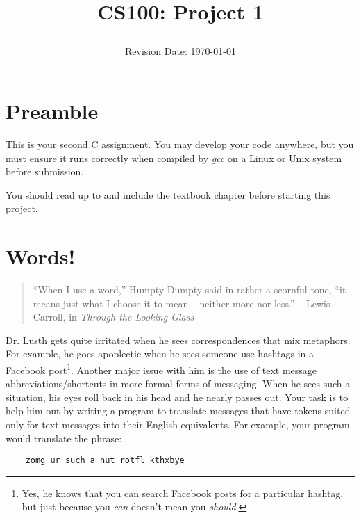 \documentclass[12pt]{article}
\title{CS100: Project 1\\
\date{Revision Date: \today}}
\begin{document}
\maketitle

\thispagestyle{empty}

\W\subsubsection*{}
\W\htmlrule

\section*{Preamble}

This is your second C assignment.  You may develop your code anywhere,
but you must ensure it runs correctly when compiled by {\it gcc}
on a Linux or Unix system
before submission.

You should read up to and include the textbook chapter
before starting this project.


\section*{Words!} 

\begin{quote}
``When I use a word,'' Humpty Dumpty said in rather a scornful tone,
``it means just what I choose it to mean -- neither more nor less.''
-- 
Lewis Carroll, in
{\it Through the Looking Glass}
\end{quote}

Dr. Lusth gets quite irritated when he sees correspondences that
mix metaphors. For example, he goes apoplectic when he sees
someone use hashtags in a Facebook post\footnote{
Yes, he knows that you can search Facebook posts for a particular
hashtag, but just because you {\it can} doesn't mean you {\it should}.}.
Another major issue with him is the use of text message abbreviations/shortcuts
in more formal forms of messaging.  When he sees such a situation,
his eyes roll back in his head and he nearly passes out.
Your task is to help him out by writing a program to
translate messages that have
tokens suited only for text messages into their English equivalents.
For example, your program would translate the phrase:

\begin{verbatim}
    zomg ur such a nut rotfl kthxbye
\end{verbatim}
\end{document}
